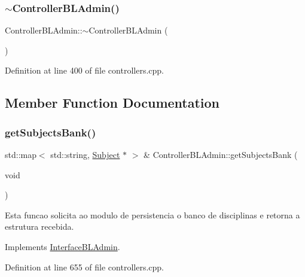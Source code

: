 \subsubsection{\texorpdfstring{$\sim$\+Controller\+B\+L\+Admin()}{~ControllerBLAdmin()}}
{\footnotesize\ttfamily Controller\+B\+L\+Admin\+::$\sim$\+Controller\+B\+L\+Admin (\begin{DoxyParamCaption}{ }\end{DoxyParamCaption})}



Definition at line 400 of file controllers.\+cpp.



\subsection{Member Function Documentation}
\mbox{\label{class_controller_b_l_admin_a86f1e998ca81cc440594d62e60fc1ed9}} 
\subsubsection{\texorpdfstring{get\+Subjects\+Bank()}{getSubjectsBank()}}
{\footnotesize\ttfamily std\+::map$<$ std\+::string, \hyperlink{class_subject}{Subject} $\ast$ $>$ \& Controller\+B\+L\+Admin\+::get\+Subjects\+Bank (\begin{DoxyParamCaption}\item[{void}]{ }\end{DoxyParamCaption})\hspace{0.3cm}{\ttfamily [virtual]}}

Esta funcao solicita ao modulo de persistencia o banco de disciplinas e retorna a estrutura recebida. 

Implements \hyperlink{class_interface_b_l_admin_ace992c81c3ca58363336ff2f7fbbda0b}{Interface\+B\+L\+Admin}.



Definition at line 655 of file controllers.\+cpp.

\mbox{\label{class_controller_b_l_admin_add75e8118f5e4f37775edfcb104281aa}} 
